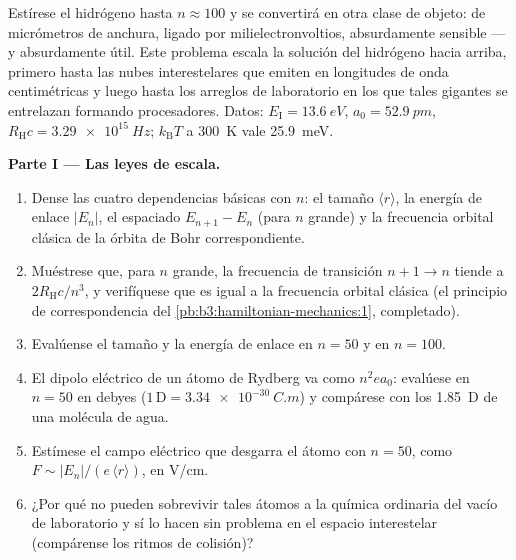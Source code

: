 \begin{problem}\label{pb:b3:hydrogen-atom:1}
Estírese el hidrógeno hasta $n \approx 100$ y se convertirá en otra clase de
objeto: de micrómetros de anchura, ligado por milielectronvoltios,
absurdamente sensible --- y absurdamente útil. Este problema escala la
solución del hidrógeno hacia arriba, primero hasta las nubes interestelares
que emiten en longitudes de onda centimétricas y luego hasta los arreglos de
laboratorio en los que tales gigantes se entrelazan formando procesadores.
Datos: $E_{\text{I}} = \qty{13.6}{eV}$, $a_0 = \qty{52.9}{pm}$,
$R_{\text{H}}c = \qty{3.29e15}{Hz}$; $k_{\text{B}}T$ a
\qty{300}{K} vale \qty{25.9}{meV}.

\medskip\noindent\textbf{Parte I --- Las leyes de escala.}
\begin{enumerate}
  \item Dense las cuatro dependencias básicas con $n$: el tamaño $\langle
        r\rangle$, la energía de enlace $|E_n|$, el espaciado $E_{n+1} - E_n$ (para
        $n$ grande) y la frecuencia orbital clásica de la
        órbita de Bohr correspondiente.
  \item Muéstrese que, para $n$ grande, la frecuencia de transición $n+1 \to
        n$ tiende a $2R_{\text{H}}c/n^3$, y verifíquese que es
        igual a la frecuencia orbital clásica (el principio de
        correspondencia del \cref{pb:b3:hamiltonian-mechanics:1},
        completado).
  \item Evalúense el tamaño y la energía de enlace en $n = 50$ y en $n = 100$.
  \item El dipolo eléctrico de un átomo de Rydberg va como $n^2ea_0$:
        evalúese en $n = 50$ en debyes ($1\,\text{D} =
        \qty{3.34e-30}{C.m}$) y compárese con los \qty{1.85}{D} de una
        molécula de agua.
  \item Estímese el campo eléctrico que desgarra el átomo con $n = 50$,
        como $F \sim |E_n|/(e\,\langle r\rangle)$, en V/cm.
  \item ¿Por qué no pueden sobrevivir tales átomos a la química ordinaria
        del vacío de laboratorio y sí lo hacen sin problema en el espacio
        interestelar (compárense los ritmos de colisión)?
\end{enumerate}


\end{problem}

